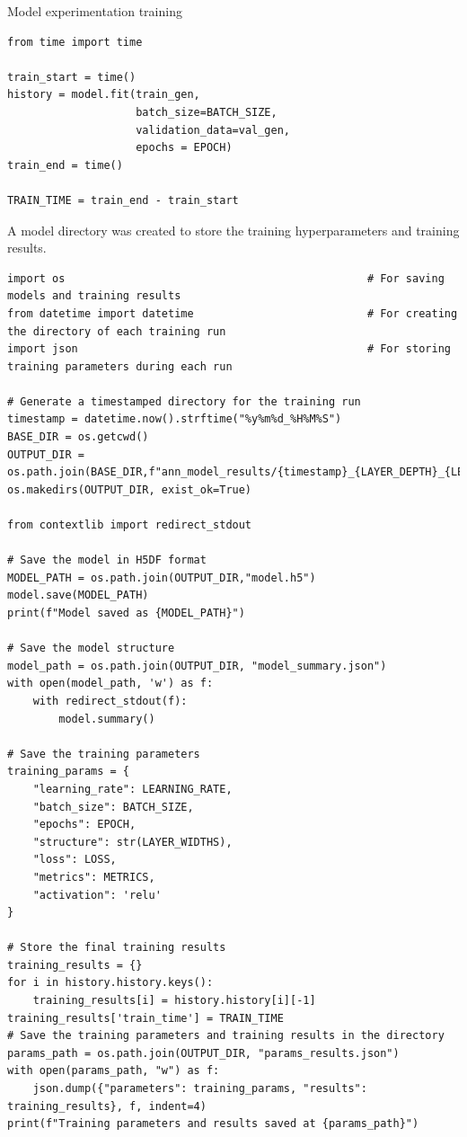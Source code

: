 \documentclass[a4paper]{article}
\begin{document}
Model experimentation training

\begin{lstlisting}
from time import time

train_start = time()
history = model.fit(train_gen,
                    batch_size=BATCH_SIZE,
                    validation_data=val_gen,
                    epochs = EPOCH)
train_end = time()

TRAIN_TIME = train_end - train_start
\end{lstlisting}

A model directory was created to store the training hyperparameters and training results.

\begin{lstlisting}
import os                                               # For saving models and training results
from datetime import datetime                           # For creating the directory of each training run
import json                                             # For storing training parameters during each run

# Generate a timestamped directory for the training run
timestamp = datetime.now().strftime("%y%m%d_%H%M%S")
BASE_DIR = os.getcwd()
OUTPUT_DIR = os.path.join(BASE_DIR,f"ann_model_results/{timestamp}_{LAYER_DEPTH}_{LEARNING_RATE}_{EPOCH}")
os.makedirs(OUTPUT_DIR, exist_ok=True)

from contextlib import redirect_stdout

# Save the model in H5DF format
MODEL_PATH = os.path.join(OUTPUT_DIR,"model.h5")
model.save(MODEL_PATH)
print(f"Model saved as {MODEL_PATH}")

# Save the model structure
model_path = os.path.join(OUTPUT_DIR, "model_summary.json")
with open(model_path, 'w') as f:
    with redirect_stdout(f):
        model.summary()

# Save the training parameters
training_params = {
    "learning_rate": LEARNING_RATE,
    "batch_size": BATCH_SIZE,
    "epochs": EPOCH,
    "structure": str(LAYER_WIDTHS),
    "loss": LOSS,
    "metrics": METRICS,
    "activation": 'relu'
}

# Store the final training results
training_results = {}
for i in history.history.keys():
    training_results[i] = history.history[i][-1]
training_results['train_time'] = TRAIN_TIME
# Save the training parameters and training results in the directory
params_path = os.path.join(OUTPUT_DIR, "params_results.json")
with open(params_path, "w") as f:
    json.dump({"parameters": training_params, "results": training_results}, f, indent=4)
print(f"Training parameters and results saved at {params_path}")
\end{lstlisting}
\end{document}

